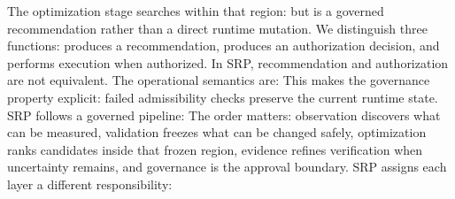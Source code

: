 {}The optimization stage searches within that region:\markdownRendererInterblockSeparator
{}\markdownRendererInterblockSeparator
{}but  is a governed recommendation rather than a direct runtime mutation.\markdownRendererParagraphSeparator
{}We distinguish three functions:\markdownRendererInterblockSeparator
{}\markdownRendererInterblockSeparator
{}produces a recommendation,\markdownRendererInterblockSeparator
{}\markdownRendererInterblockSeparator
{}produces an authorization decision, and\markdownRendererInterblockSeparator
{}\markdownRendererInterblockSeparator
{}performs execution when authorized. In SRP, recommendation and authorization are not equivalent. The operational semantics are:\markdownRendererInterblockSeparator
{}\markdownRendererInterblockSeparator
{}This makes the governance property explicit: failed admissibility checks preserve the current runtime state.\markdownRendererInterblockSeparator
{}
\markdownRendererSectionEnd \markdownRendererSectionBegin
{}\markdownRendererInterblockSeparator
{}SRP follows a governed pipeline:\markdownRendererInterblockSeparator
{}\markdownRendererInterblockSeparator
{}The order matters: observation discovers what can be measured, validation freezes what can be changed safely, optimization ranks candidates inside that frozen region, evidence refines verification when uncertainty remains, and governance is the approval boundary.\markdownRendererInterblockSeparator
{}
\markdownRendererSectionEnd \markdownRendererSectionBegin
{}\markdownRendererInterblockSeparator
{}SRP assigns each layer a different responsibility:\markdownRendererInterblockSeparator
{}\markdownRendererInterblockSeparator
